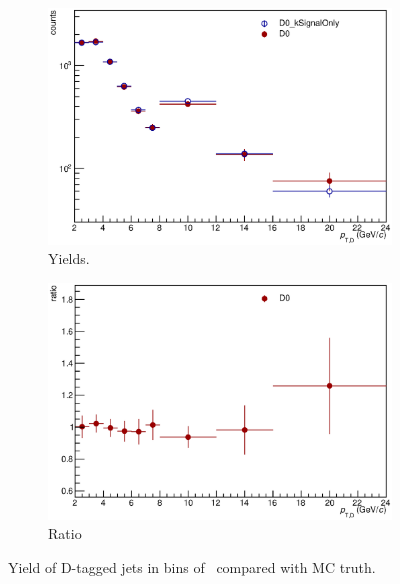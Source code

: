\begin{figure}[tbh]
\centering
\begin{subfigure}{0.49\textwidth}
  \centering
  \includegraphics[width=1.0\linewidth]{img/D_Pt_Spectrum_SpectraComparison}
  \caption{Yields.}
\end{subfigure}
\begin{subfigure}{0.49\textwidth}
  \centering
  \includegraphics[width=1.0\linewidth]{img/D_Pt_Spectrum_SpectraComparison_Ratio}
  \caption{Ratio}
\end{subfigure}
\caption{Yield of D-tagged jets in bins of \ptd\ compared with MC truth.}
\label{fig:YieldPtD}
\end{figure}


